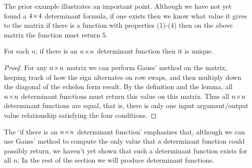 The prior example illustrates an important point.
Although we have not yet found a $4 \! \times \! 4$ determinant formula,
if one exists then we know what value it gives to the matrix \Dash  
if there is a function with properties (1)-(4) then on the above 
matrix the function must return $5$.

\begin{lemma}
For each $n$, 
if there is an $n \! \times \! n$ determinant function then it is unique.
\end{lemma}

\begin{proof}
For any $n \! \times \! n$ matrix 
we can perform Gauss' method on the 
matrix, keeping track of how the sign alternates on row swaps, and then 
multiply down the diagonal of the echelon form result.
By the definition and the lemma,
all $n \! \times \! n$ determinant functions must return this value on this matrix.
Thus all $n \! \times \! n$ determinant functions are equal, that is, there is only
one input argument/output value relationship satisfying
the four conditions.
\end{proof}

The `if there is an $n \! \times \! n$ determinant function' 
emphasizes that,
although we can
use Gauss' method to compute the only value that a determinant function 
could possibly return, 
we haven't yet shown that such a determinant function exists for all $n$.
In the rest of the section we will produce determinant functions.

